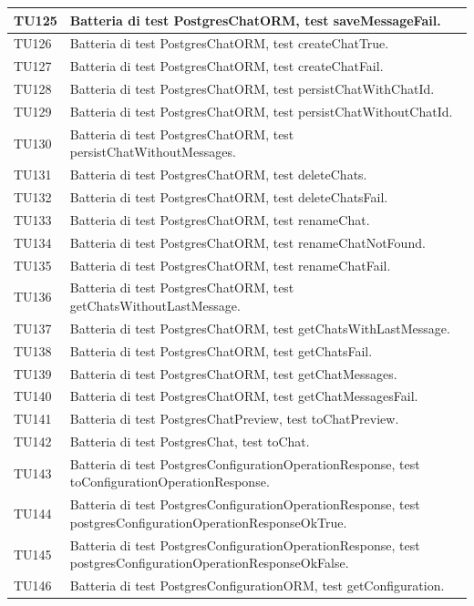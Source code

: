 \documentclass[10pt, a4paper]{article}
\begin{document}
\begin{xltabular}{\textwidth}{p{0.12\textwidth}|X}
\hline
TU125 & Batteria di test PostgresChatORM, test saveMessageFail. \\
\hline
TU126 & Batteria di test PostgresChatORM, test createChatTrue. \\
\hline
TU127 & Batteria di test PostgresChatORM, test createChatFail. \\
\hline
TU128 & Batteria di test PostgresChatORM, test persistChatWithChatId. \\
\hline
TU129 & Batteria di test PostgresChatORM, test persistChatWithoutChatId. \\
\hline
TU130 & Batteria di test PostgresChatORM, test persistChatWithoutMessages. \\
\hline
TU131 & Batteria di test PostgresChatORM, test deleteChats. \\
\hline
TU132 & Batteria di test PostgresChatORM, test deleteChatsFail. \\
\hline
TU133 & Batteria di test PostgresChatORM, test renameChat. \\
\hline
TU134 & Batteria di test PostgresChatORM, test renameChatNotFound. \\
\hline
TU135 & Batteria di test PostgresChatORM, test renameChatFail. \\
\hline
TU136 & Batteria di test PostgresChatORM, test getChatsWithoutLastMessage. \\
\hline
TU137 & Batteria di test PostgresChatORM, test getChatsWithLastMessage. \\
\hline
TU138 & Batteria di test PostgresChatORM, test getChatsFail. \\
\hline
TU139 & Batteria di test PostgresChatORM, test getChatMessages. \\
\hline
TU140 & Batteria di test PostgresChatORM, test getChatMessagesFail. \\
\hline
TU141 & Batteria di test PostgresChatPreview, test toChatPreview. \\
\hline
TU142 & Batteria di test PostgresChat, test toChat. \\
\hline
TU143 & Batteria di test PostgresConfigurationOperationResponse, test toConfigurationOperationResponse. \\
\hline
TU144 & Batteria di test PostgresConfigurationOperationResponse, test postgresConfigurationOperationResponseOkTrue. \\
\hline
TU145 & Batteria di test PostgresConfigurationOperationResponse, test postgresConfigurationOperationResponseOkFalse. \\
\hline
TU146 & Batteria di test PostgresConfigurationORM, test getConfiguration. \\

\end{xltabular}
\end{document}
